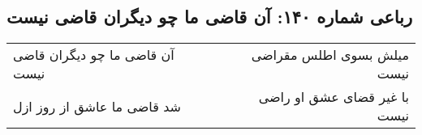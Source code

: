 \begin{center}
\section*{رباعی شماره ۱۴۰: آن قاضی ما چو دیگران قاضی نیست}
\label{sec:0140}
\begin{longtable}{l p{0.5cm} r}
آن قاضی ما چو دیگران قاضی نیست
&&
میلش بسوی اطلس مقراضی نیست
\\
شد قاضی ما عاشق از روز ازل
&&
با غیر قضای عشق او راضی نیست
\\
\end{longtable}
\end{center}
